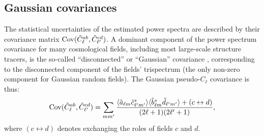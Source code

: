 \documentclass[%
 reprint,
superscriptaddress,
nofootinbib,
 amsmath,amssymb,
 aps,
 prd,
]{revtex4-2}
\begin{document}
  \subsection{Gaussian covariances}\label{ssec:pcls.cov}
    The statistical uncertainties of the estimated power spectra are described by their covariance matrix ${\rm Cov}(\tilde{C}^{ab}_\ell,\tilde{C}^{cd}_{\ell'})$. A dominant component of the power spectrum covariance for many cosmological fields, including most large-scale structure tracers, is the so-called ``disconnected'' or ``Gaussian'' covariance \cite{1607.00043}, corresponding to the disconnected component of the fields' trispectrum (the only non-zero component for Gaussian random fields). The Gaussian pseudo-$C_\ell$ covariance is thus:
    \begin{equation}\nonumber
      {\rm Cov}(\tilde{C}^{ab}_\ell,\tilde{C}^{cd}_{\ell'})=\sum_{mm'}\frac{\langle \tilde{a}_{\ell m}\tilde{c}_{\ell'm'}^*\rangle\langle \tilde{b}^*_{\ell m}\tilde{d}_{\ell'm'}\rangle+(c\leftrightarrow d)}{(2\ell+1)(2\ell'+1)},
    \end{equation}
    where $(c\leftrightarrow d)$ denotes exchanging the roles of fields $c$ and $d$. 
    
\end{document}
